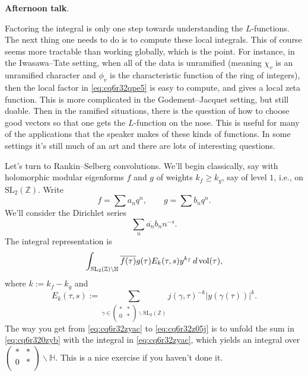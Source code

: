 \documentclass[reqno]{amsart} 
\numberwithin{theorem}{section}
\numberwithin{equation}{section}
\numberwithin{exercise}{section}
\begin{document}
\textbf{Afternoon talk}.

Factoring the integral is only one step towards understanding the $L$-functions.  The next thing one needs to do is to compute these local integrals.  This of course seems more tractable than working globally, which is the point.  For instance, in the Iwasawa--Tate setting, when all of the data is unramified (meaning $\chi_v$ is an unramified character and $\phi_v$ is the characteristic function of the ring of integers), then the local factor in \eqref{eq:cq6r32qpe5} is easy to compute, and gives a local zeta function.  This is more complicated in the Godement--Jacquet setting, but still doable.  Then in the ramified situations, there is the question of how to choose good vectors so that one gets the $L$-function on the nose.  This is useful for many of the applications that the speaker makes of these kinds of functions.  In some settings it's still much of an art and there are lots of interesting questions.

Let's turn to Rankin--Selberg convolutions.  We'll begin classically, say with holomorphic modular eigenforms $f$ and $g$ of weights $k_f \geq k_g$, say of level $1$, i.e., on $\mathrm{SL}_2(\mathbb{Z})$.  Write
\begin{equation*}
  f = \sum a_n q^n, \qquad g = \sum b_n q^n.
\end{equation*}
We'll consider the Dirichlet series
\begin{equation}\label{eq:cq6r32z05j}
  \sum_n \overline{a_n} b_n n^{- s}.
\end{equation}
The integral representation is
\begin{equation}\label{eq:cq6r32zyac}
  \int_{\mathrm{SL}_2(\mathbb{Z}) \backslash \mathbb{H}} \overline{f(\tau)} g(\tau)
  E_k(\tau, s)
  y^{k_f}
  \, d \operatorname{vol}(\tau),
\end{equation}
where $k := k_f - k_g$ and
\begin{equation}\label{eq:cq6r320zyb}
  E_k(\tau, s)
  := \sum_{\gamma \in
    \begin{pmatrix}
      \ast      & \ast \\
      0             & \ast \\
    \end{pmatrix} \backslash \mathrm{SL}_2(\mathbb{Z})}
  j(\gamma, \tau)^{- k} \lvert y(\gamma(\tau)) \rvert^k.
\end{equation}
The way you get from \eqref{eq:cq6r32zyac} to \eqref{eq:cq6r32z05j} is to unfold the sum in \eqref{eq:cq6r320zyb} with the integral in \eqref{eq:cq6r32zyac}, which yields an integral over $
\begin{pmatrix}
  \ast  & \ast \\
  0     & \ast \\
\end{pmatrix} \backslash \mathbb{H}$.  This is a nice exercise if you haven't done it.
\end{document}
